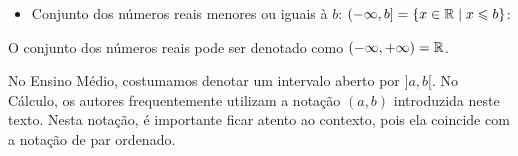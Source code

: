 \begin{itemize}
\item Conjunto dos números reais menores ou iguais à $b$: $(-\infty, b] = \{ x \in \mathbb{R} \mid x \leqslant b \}$:
 \begin{center}
 \end{center}
\end{itemize}

O conjunto dos números reais pode ser denotado como $(-\infty, +\infty) = \mathbb{R}$.



\begin{obs}
    No Ensino Médio, costumamos denotar um intervalo aberto por $]a,b[$. No Cálculo, os autores frequentemente utilizam a notação $(a,b)$ introduzida neste texto. Nesta notação, é importante ficar atento ao contexto, pois ela coincide com a notação de par ordenado.
\end{obs}

